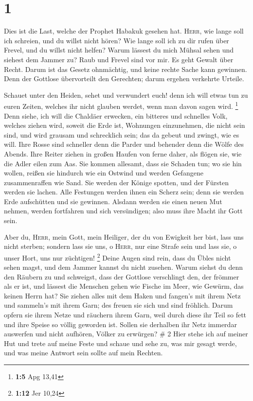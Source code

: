 \hypertarget{section}{%
\section{1}\label{section}}

 Dies ist die Last, welche der Prophet Habakuk gesehen
hat.  \textsc{Herr}, wie lange soll ich schreien, und du
willst nicht hören? Wie lange soll ich zu dir rufen über Frevel, und du
willst nicht helfen?  Warum lässest du mich Mühsal sehen
und siehest dem Jammer zu? Raub und Frevel sind vor mir. Es geht Gewalt
über Recht.  Darum ist das Gesetz ohnmächtig, und keine
rechte Sache kann gewinnen. Denn der Gottlose übervorteilt den
Gerechten; darum ergehen verkehrte Urteile.

 Schauet unter den Heiden, sehet und verwundert euch! denn
ich will etwas tun zu euren Zeiten, welches ihr nicht glauben werdet,
wenn man davon sagen wird. \footnote{\textbf{1:5} Apg 13,41}
 Denn siehe, ich will die Chaldäer erwecken, ein bitteres
und schnelles Volk, welches ziehen wird, soweit die Erde ist, Wohnungen
einzunehmen, die nicht sein sind,  und wird grausam und
schrecklich sein; das da gebeut und zwingt, wie es will. 
Ihre Rosse sind schneller denn die Parder und behender denn die Wölfe
des Abends. Ihre Reiter ziehen in großen Haufen von ferne daher, als
flögen sie, wie die Adler eilen zum Aas.  Sie kommen
allesamt, dass sie Schaden tun; wo sie hin wollen, reißen sie hindurch
wie ein Ostwind und werden Gefangene zusammenraffen wie Sand.
 Sie werden der Könige spotten, und der Fürsten werden
sie lachen. Alle Festungen werden ihnen ein Scherz sein; denn sie werden
Erde aufschütten und sie gewinnen.  Alsdann werden sie
einen neuen Mut nehmen, werden fortfahren und sich versündigen; also
muss ihre Macht ihr Gott sein.

 Aber du, \textsc{Herr}, mein Gott, mein Heiliger, der du
von Ewigkeit her bist, lass uns nicht sterben; sondern lass sie uns, o
\textsc{Herr}, nur eine Strafe sein und lass sie, o unser Hort, uns nur
züchtigen! \footnote{\textbf{1:12} Jer 10,24}  Deine
Augen sind rein, dass du Übles nicht sehen magst, und dem Jammer kannst
du nicht zusehen. Warum siehst du denn den Räubern zu und schweigst,
dass der Gottlose verschlingt den, der frömmer als er ist,
 und lässest die Menschen gehen wie Fische im Meer, wie
Gewürm, das keinen Herrn hat?  Sie ziehen alles mit dem
Haken und fangen's mit ihrem Netz und sammeln's mit ihrem Garn; des
freuen sie sich und sind fröhlich.  Darum opfern sie
ihrem Netze und räuchern ihrem Garn, weil durch diese ihr Teil so fett
und ihre Speise so völlig geworden ist.  Sollen sie
derhalben ihr Netz immerdar auswerfen und nicht aufhören, Völker zu
erwürgen? \# 2  Hier stehe ich auf meiner Hut und trete
auf meine Feste und schaue und sehe zu, was mir gesagt werde, und was
meine Antwort sein sollte auf mein Rechten.

